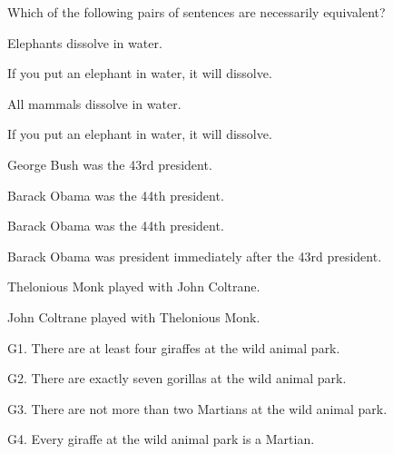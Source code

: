 \problempart Which of the following pairs of sentences are necessarily  equivalent? 
\begin{earg}
\item Elephants dissolve in water.
\item[]	If you put an elephant in water, it will dissolve.\smallskip
\item All mammals dissolve in water.
\item[]	If you put an elephant in water, it will dissolve.\smallskip 

\item George Bush was the 43rd president. 
\item[]	Barack Obama was the 44th president.\smallskip 
\item Barack Obama was the 44th president.
\item[]	Barack Obama was president immediately after the 43rd president.\smallskip 



\item  Thelonious Monk played with John Coltrane.
	\item[]	John Coltrane played with Thelonious Monk.\smallskip

\end{earg}

\filbreak
\problempart  
\begin{earg}%
\item[G1.] \label{itm:at_least_four}There are at least four giraffes at the wild animal park.
\item[G2.] \label{itm:exactly_seven} There are exactly seven gorillas at the wild animal park.
\item[G3.] \label{itm:not_more_than_two} There are not more than two Martians at the wild animal park.
\item[G4.] \label{itm:martians} Every giraffe at the wild animal park is a Martian.
\end{earg}

